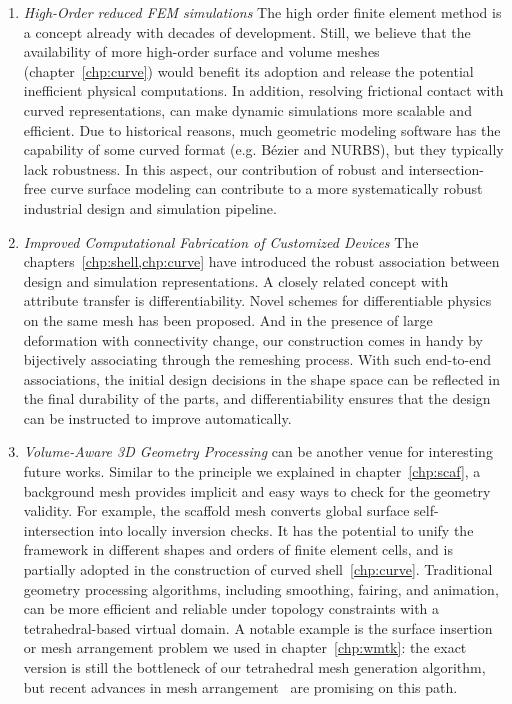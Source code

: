 \begin{enumerate}
\item \emph{High-Order reduced FEM simulations}
The high order finite element method is a concept already with decades of development. Still, we believe that the availability of more high-order surface and volume meshes (chapter~\ref{chp:curve}) would benefit its adoption and release the potential inefficient physical computations. In addition, resolving frictional contact with curved representations, \cite{ferguson2022high} can make dynamic simulations more scalable and efficient. 
Due to historical reasons, much geometric modeling software has the capability of some curved format (e.g. B{\'e}zier and NURBS), but they typically lack robustness. In this aspect, our contribution of robust and intersection-free curve surface modeling can contribute to a more systematically robust industrial design and simulation pipeline.

\item \emph{Improved Computational Fabrication of Customized Devices}
The chapters~\ref{chp:shell,chp:curve} have introduced the robust association between design and simulation representations. A closely related concept with attribute transfer is differentiability. Novel schemes for differentiable physics on the same mesh has been proposed. And in the presence of large deformation with connectivity change, our construction comes in handy by bijectively associating through the remeshing process. 
With such end-to-end associations, the initial design decisions in the shape space can be reflected in the final durability of the parts, and differentiability ensures that the design can be instructed to improve automatically.  

\item \emph{Volume-Aware 3D Geometry Processing}
can be another venue for interesting future works. 
Similar to the principle we explained in chapter~\ref{chp:scaf}, a background mesh provides implicit and easy ways to check for the geometry validity. For example, the scaffold mesh converts global surface self-intersection into locally inversion checks. It has the potential to unify the framework in different shapes and orders of finite element cells, and is partially adopted in the construction of curved shell~\ref{chp:curve}. Traditional geometry processing algorithms, including smoothing, fairing, and animation, can be more efficient and reliable under topology constraints with a tetrahedral-based virtual domain. A notable example is the surface insertion or mesh arrangement problem we used in chapter~\ref{chp:wmtk}: the exact version is still the bottleneck of our tetrahedral mesh generation algorithm, but recent advances in mesh arrangement~\cite{Hu:2019:fTetWild,zhou2016mesh,ember2022} are promising on this path.


\end{enumerate}
